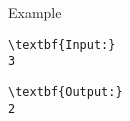 Example  
\begin{verbatim}
\textbf{Input:}
3\end{verbatim}
\begin{verbatim}
\textbf{Output:}
2
\end{verbatim}